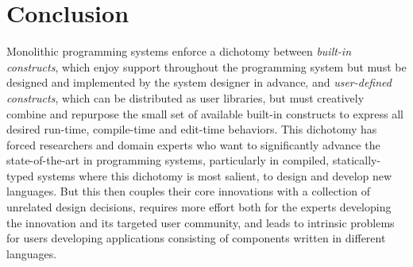 \section{Conclusion}

Monolithic programming systems enforce a dichotomy between \emph{built-in constructs}, which enjoy support throughout the programming system but must be designed and implemented by the system designer in advance, and \emph{user-defined constructs}, which can be distributed as user libraries, but must creatively combine and repurpose the small set of available built-in constructs to express all desired run-time, compile-time and edit-time behaviors. This dichotomy has forced researchers and domain experts who want to significantly advance the state-of-the-art in programming systems, particularly in compiled, statically-typed systems where this dichotomy is most salient, to design and develop new languages. But this then couples their core innovations with a collection of unrelated design decisions, requires more effort both for the experts developing the innovation and its targeted user community, and leads to intrinsic problems for users developing applications consisting of components written in different languages.
\newpage
\listoftodos
\newpage